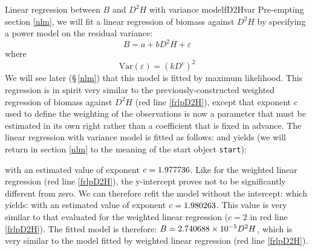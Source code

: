 \begin{filrouge}{Linear regression between $B$ and $D^2H$ with variance model}{fD2Hvar}%
Pre-empting section \ref{nlm}, we will fit a linear regression of biomass against $D^2H$ by specifying a power model on the residual variance:
\[
B=a+bD^2H+\varepsilon
\]
where
\[
\mathrm{Var}(\varepsilon)=(kD^c)^2
\]
We will see later (\S\,\ref{nlm}) that this model is fitted by maximum likelihood. This regression is in spirit very similar to the previously-constructed weighted regression of biomass against $D^2H$ (red line \ref{frlpD2H}), except that exponent $c$ used to define the weighting of the observations is now a parameter that must be estimated in its own right rather than a coefficient that is fixed in advance. The linear regression with variance model is fitted as follows:
%
and yields (we will return in section \ref{nlm} to the meaning of the start object \texttt{start}):

%
with an estimated value of exponent $c=\mbox{1.977736}$. Like for the weighted linear regression (red line \ref{frlpD2H}), the y-intercept proves not to be significantly different from zero. We can therefore refit the model without the intercept:
%
%
which yields:
%
with an estimated value of exponent $c=\mbox{1.980263}$. This value is very similar to that evaluated for the weighted linear regression ($c=2$ in red line \ref{frlpD2H}). The fitted model is therefore: $B=\mbox{2.740688}\times10^{-5}D^2H$, which is very similar to the model fitted by weighted linear regression (red line \ref{frlpD2H}).
\end{filrouge}

